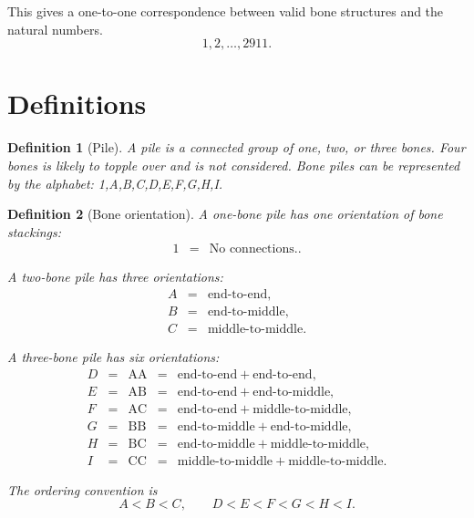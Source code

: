 \documentclass[11pt]{article}
\newtheorem{definition}{Definition}[section]
\theoremstyle{remark}
\begin{document}
This gives a one-to-one correspondence between valid bone structures and the natural numbers.
\[
1,2,\ldots,2911.
\]

\newpage
\section{Definitions}
\bigskip 
\begin{definition}[Pile]
A \emph{pile} is a connected group of one, two, or three bones. Four bones is likely to topple over and is not considered. Bone piles can be represented by the alphabet:
\emph{1,A,B,C,D,E,F,G,H,I}.
\end{definition}

\begin{definition}[Bone orientation]
A one-bone pile has one orientation of bone stackings:
\[
\begin{array}{ccl}
1 &=& \text{No connections.}.
\end{array}
\]

A two-bone pile has three orientations:
\[
\begin{array}{ccl}
A &=& \text{end-to-end},\\
B &=& \text{end-to-middle},\\
C &=& \text{middle-to-middle}.
\end{array}
\]

A three-bone pile has six orientations:
\[
\begin{array}{cclcl}
D &=& \text{AA} &=& \text{end-to-end} + \text{end-to-end},\\
E &=& \text{AB} &=& \text{end-to-end} + \text{end-to-middle},\\
F &=& \text{AC} &=& \text{end-to-end} + \text{middle-to-middle},\\
G &=& \text{BB} &=& \text{end-to-middle} + \text{end-to-middle},\\
H &=& \text{BC} &=& \text{end-to-middle} + \text{middle-to-middle},\\
I &=& \text{CC} &=& \text{middle-to-middle} + \text{middle-to-middle}.
\end{array}
\]

The ordering convention is
\[
A<B<C,\qquad D<E<F<G<H<I.
\]
\end{definition}
\end{document}
